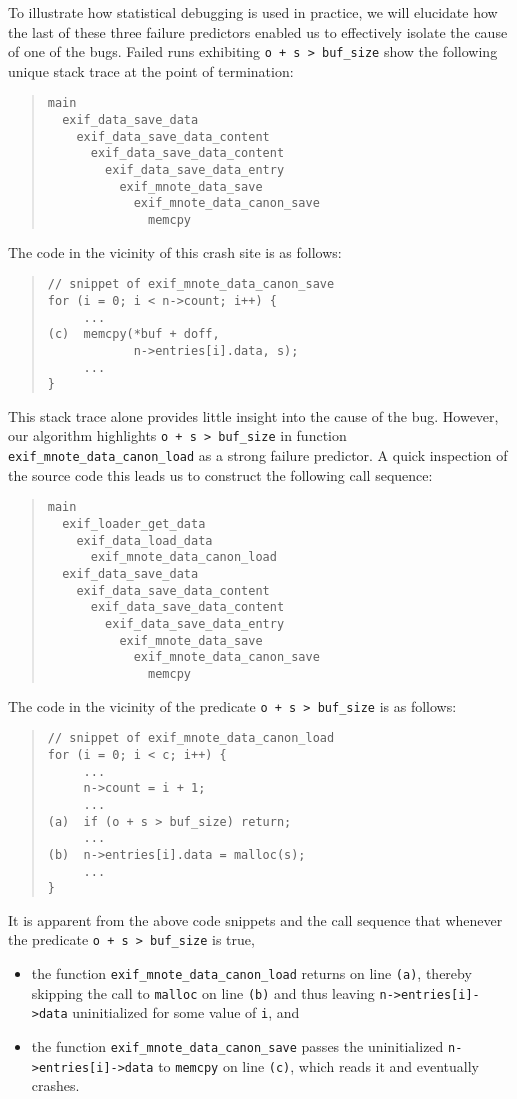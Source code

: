 To illustrate how statistical debugging is used in practice, we will
elucidate how the last of these three failure predictors enabled us to
effectively isolate the cause of one of the bugs.  Failed runs
exhibiting \texttt{o + s > buf\_size} show the following unique stack
trace at the point of termination:
\begin{quote}
  \small
\begin{verbatim}
main
  exif_data_save_data
    exif_data_save_data_content
      exif_data_save_data_content
        exif_data_save_data_entry
          exif_mnote_data_save
            exif_mnote_data_canon_save
              memcpy
\end{verbatim}
\end{quote}
The code in the vicinity of this crash site is as follows:
\begin{quote}
\begin{verbatim}
// snippet of exif_mnote_data_canon_save
for (i = 0; i < n->count; i++) {
     ...
(c)  memcpy(*buf + doff,
            n->entries[i].data, s);
     ...
}
\end{verbatim}
\end{quote}
This stack trace alone provides little insight into the cause of the
bug.  However, our algorithm highlights {\tt o + s > buf\_size} in
function {\tt exif\_mnote\_data\_canon\_load} as a strong failure
predictor.  A quick inspection of the source code this leads us to
construct the following call sequence:
\begin{quote}
  \small
\begin{verbatim}
main
  exif_loader_get_data 
    exif_data_load_data
      exif_mnote_data_canon_load
  exif_data_save_data
    exif_data_save_data_content
      exif_data_save_data_content
        exif_data_save_data_entry
          exif_mnote_data_save
            exif_mnote_data_canon_save
              memcpy
\end{verbatim}
\end{quote}
The code in the vicinity of the predicate {\tt o + s > buf\_size} is as follows:
\begin{quote}
\begin{verbatim}
// snippet of exif_mnote_data_canon_load
for (i = 0; i < c; i++) {
     ...
     n->count = i + 1;
     ...
(a)  if (o + s > buf_size) return;
     ...
(b)  n->entries[i].data = malloc(s); 
     ...
}
\end{verbatim}
\end{quote}
It is apparent from the above code snippets and the
call sequence that whenever the predicate {\tt o + s > buf\_size} is true,
\begin{itemize}
\item the function \texttt{exif\_mnote\_data\_canon\_load} returns on
  line \texttt{(a)}, thereby skipping the call to \texttt{malloc} on
  line \texttt{(b)} and thus leaving \texttt{n->entries[i]->data}
  uninitialized for some value of \texttt{i}, and

\item the function {\tt exif\_mnote\_data\_canon\_save} passes the
  uninitialized {\tt n->entries[i]->data} to {\tt memcpy} on line
  \texttt{(c)}, which reads it and eventually crashes.
\end{itemize}

